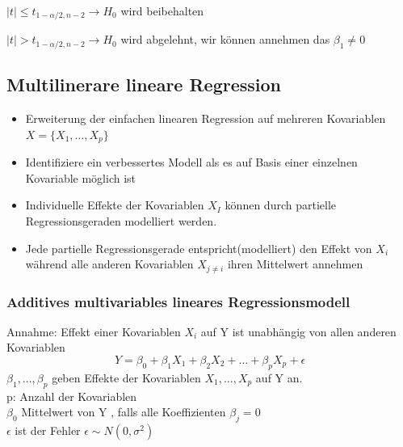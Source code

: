 \documentclass[10pt]{report}
\theoremstyle{definition}
\begin{document}
$|t| \leq  t_{1-\alpha/2, n-2} \rightarrow H_0$ wird beibehalten

$|t| >  t_{1-\alpha/2, n-2} \rightarrow H_0$ wird abgelehnt, wir können annehmen das $\beta_1 \neq 0$

\subsection{Multilinerare lineare Regression}
\begin{itemize}
	\item Erweiterung der einfachen linearen Regression auf mehreren Kovariablen $X=\{{X_1, \ldots, X_p}\}$
	\item Identifiziere ein verbessertes Modell als es auf Basis einer einzelnen Kovariable möglich ist 
	\item Individuelle Effekte der Kovariablen $X_I$ können durch partielle Regressionsgeraden modelliert werden.
	\item Jede partielle Regressionsgerade entspricht(modelliert) den Effekt von $X_i$ während alle anderen Kovariablen $X_{j \neq i}$ ihren Mittelwert annehmen
\end{itemize}

\subsubsection{Additives multivariables lineares Regressionsmodell}
Annahme: Effekt einer Kovariablen $X_i$ auf Y ist unabhängig von allen anderen Kovariablen 
\[Y = \beta_0 + \beta_1X_1 + \beta_2X_2 + \ldots + \beta_p X_p + \epsilon\]
$ \beta_1,\ldots,\beta_p$ geben Effekte der Kovariablen $X_1, \ldots, X_p$ auf Y an.\\
p: Anzahl der Kovariablen\\ 
$ \beta_0 $ Mittelwert von Y , falls alle Koeffizienten $ \beta_j = 0 $\\
$\epsilon$ ist der Fehler $\epsilon \sim N(0, \sigma^2)$


\end{document}
